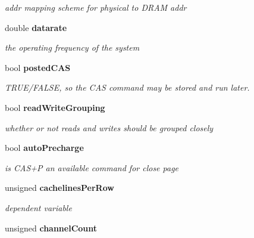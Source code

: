 \begin{CompactItemize}
\begin{CompactList}\small\item\em addr mapping scheme for physical to DRAM addr \item\end{CompactList}\item 
double {\bf datarate}\label{class_d_r_a_msim_i_i_1_1_system_configuration_d883c4bc92b6a4f3750d1fde61e6c3c7}

\begin{CompactList}\small\item\em the operating frequency of the system \item\end{CompactList}\item 
bool {\bf postedCAS}\label{class_d_r_a_msim_i_i_1_1_system_configuration_9ca31c762ad14165cb6217a710b34ad8}

\begin{CompactList}\small\item\em TRUE/FALSE, so the CAS command may be stored and run later. \item\end{CompactList}\item 
bool {\bf readWriteGrouping}\label{class_d_r_a_msim_i_i_1_1_system_configuration_a81278f33bba62be976d2cb202721645}

\begin{CompactList}\small\item\em whether or not reads and writes should be grouped closely \item\end{CompactList}\item 
bool {\bf autoPrecharge}\label{class_d_r_a_msim_i_i_1_1_system_configuration_3dd04fddc806ef679c1c4bc8279eb043}

\begin{CompactList}\small\item\em is CAS+P an available command for close page \item\end{CompactList}\item 
unsigned {\bf cachelinesPerRow}\label{class_d_r_a_msim_i_i_1_1_system_configuration_d6dd64e93af4a789af60a737c606c4e7}

\begin{CompactList}\small\item\em dependent variable \item\end{CompactList}\item 
unsigned {\bf channelCount}\label{class_d_r_a_msim_i_i_1_1_system_configuration_412130db785c220ed1d2c43310e19364}


\end{CompactItemize}
